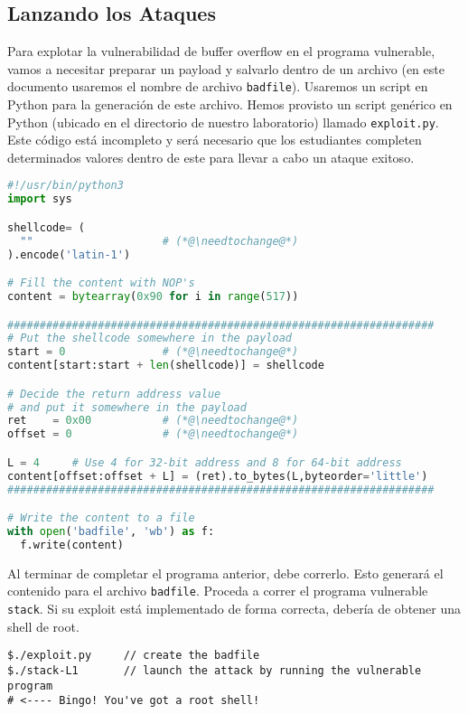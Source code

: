 \subsection{Lanzando los Ataques} 


Para explotar la vulnerabilidad de buffer overflow en el programa vulnerable, vamos a necesitar preparar un payload y salvarlo dentro de un archivo (en este documento usaremos el nombre de archivo \texttt{badfile}).
Usaremos un script en Python para la generación de este archivo. 
Hemos provisto un script genérico en Python (ubicado en el directorio de nuestro laboratorio) llamado \texttt{exploit.py}.
Este código está incompleto y será necesario que los estudiantes completen determinados valores dentro de este para llevar a cabo un ataque exitoso.


\newcommand{\needtochange}{\ding{73} Necesita completarse \ding{73}}


\begin{lstlisting}[language=python, caption={\texttt{exploit.py}}]
#!/usr/bin/python3
import sys

shellcode= (
  ""                    # (*@\needtochange@*)
).encode('latin-1')

# Fill the content with NOP's
content = bytearray(0x90 for i in range(517))

##################################################################
# Put the shellcode somewhere in the payload
start = 0               # (*@\needtochange@*)
content[start:start + len(shellcode)] = shellcode

# Decide the return address value
# and put it somewhere in the payload
ret    = 0x00           # (*@\needtochange@*)
offset = 0              # (*@\needtochange@*)

L = 4     # Use 4 for 32-bit address and 8 for 64-bit address
content[offset:offset + L] = (ret).to_bytes(L,byteorder='little')
##################################################################

# Write the content to a file
with open('badfile', 'wb') as f:
  f.write(content)
\end{lstlisting}

Al terminar de completar el programa anterior, debe correrlo. Esto generará el contenido para el archivo \texttt{badfile}. Proceda a correr el programa vulnerable {\tt stack}. Si su exploit está implementado de forma correcta, debería de obtener una shell de root.


\begin{lstlisting}
$./exploit.py     // create the badfile
$./stack-L1       // launch the attack by running the vulnerable program
# <---- Bingo! You've got a root shell! 
\end{lstlisting}


